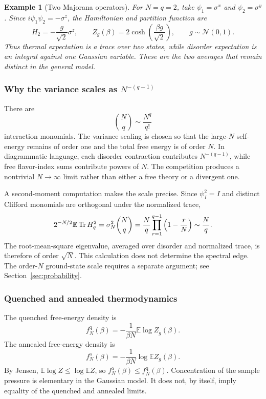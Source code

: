 \documentclass[11pt]{article}
\numberwithin{equation}{section}
\theoremstyle{exposition}
\newtheorem{example}[definition]{Example}
\theoremstyle{result}
\newcommand{\E}{\mathbb E}
\begin{document}
\begin{example}[Two Majorana operators]
For $N=q=2$, take $\psi_1=\sigma^x$ and $\psi_2=\sigma^y$. Since $i\psi_1\psi_2=-\sigma^z$, the Hamiltonian and partition function are
\begin{equation*}
H_2=-\frac{g}{\sqrt2}\sigma^z,
\qquad
Z_g(\beta)=2\cosh\left(\frac{\beta g}{\sqrt2}\right),
\qquad g\sim\mathcal N(0,1).
\end{equation*}
Thus thermal expectation is a trace over two states, while disorder expectation is an integral against one Gaussian variable. These are the two averages that remain distinct in the general model.
\end{example}

\subsubsection{Why the variance scales as $N^{-(q-1)}$}

There are
\begin{equation*}
\binom Nq\sim \frac{N^q}{q!}
\end{equation*}
interaction monomials. The variance scaling is chosen so that the large-$N$ self-energy remains of order one and the total free energy is of order $N$. In diagrammatic language, each disorder contraction contributes $N^{-(q-1)}$, while free flavor-index sums contribute powers of $N$. The competition produces a nontrivial $N\to\infty$ limit rather than either a free theory or a divergent one.

A second-moment computation makes the scale precise. Since $\psi_I^2=I$ and distinct Clifford monomials are orthogonal under the normalized trace,
\begin{equation*}
2^{-N/2}\E\Tr H_q^2
=\sigma_N^2\binom Nq
=\frac Nq\prod_{r=1}^{q-1}\left(1-\frac rN\right)
\sim\frac Nq.
\end{equation*}
The root-mean-square eigenvalue, averaged over disorder and normalized trace, is therefore of order $\sqrt N$. This calculation does not determine the spectral edge. The order-$N$ ground-state scale requires a separate argument; see Section~\ref{sec:probability}.

\subsubsection{Quenched and annealed thermodynamics}

The quenched free-energy density is
\begin{equation*}
f_N^{\mathrm q}(\beta)
=-\frac1{\beta N}\E\log Z_g(\beta).
\end{equation*}
The annealed free-energy density is
\begin{equation*}
f_N^{\mathrm a}(\beta)
=-\frac1{\beta N}\log\E Z_g(\beta).
\end{equation*}
By Jensen, $\E\log Z\le \log\E Z$, so $f_N^{\mathrm a}(\beta)\le f_N^{\mathrm q}(\beta)$. Concentration of the sample pressure is elementary in the Gaussian model. It does not, by itself, imply equality of the quenched and annealed limits.
\end{document}
